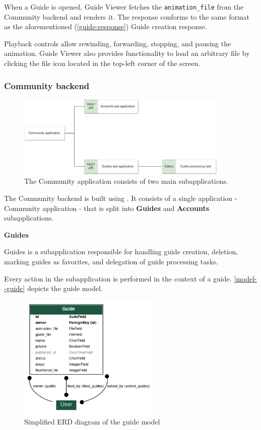 When a Guide is opened, Guide Viewer fetches the \texttt{animation\_file} from the Community backend and renders it.
The response conforms to the same format as the aforementioned (\autoref{guide-response}) Guide creation response.

\medskip
Playback controls allow rewinding, forwarding, stopping, and pausing the animation. Guide Viewer also provides functionality to load an arbitrary  file by clicking the file icon located in the top-left corner of the screen.


\subsubsection{Community backend}

\begin{figure}[hb]
  \caption{The Community application consists of two main subapplications.}
  \label{3-backend-community-components}
  \centering
    \includegraphics[width=0.9\textwidth]{assets/3-community-application.png}
\end{figure}

The Community backend is built using . It consists of a single application - Community application - that is split into \textbf{Guides} and \textbf{Accounts} subapplications.

\medskip

\textbf{Guides}

Guides is a subapplication responsible for handling guide creation, deletion, marking guides as favorites, and delegation of guide processing tasks.

\medskip

Every action in the subapplication is performed in the context of a guide. \autoref{model--guide} depicts the guide model.

\begin{figure}[H]
  \caption{\label{model--guide}Simplified ERD diagram of the guide model}
    \centering
    \includegraphics[width=0.6\textwidth]{assets/3-erd-guides.png}
\end{figure}

